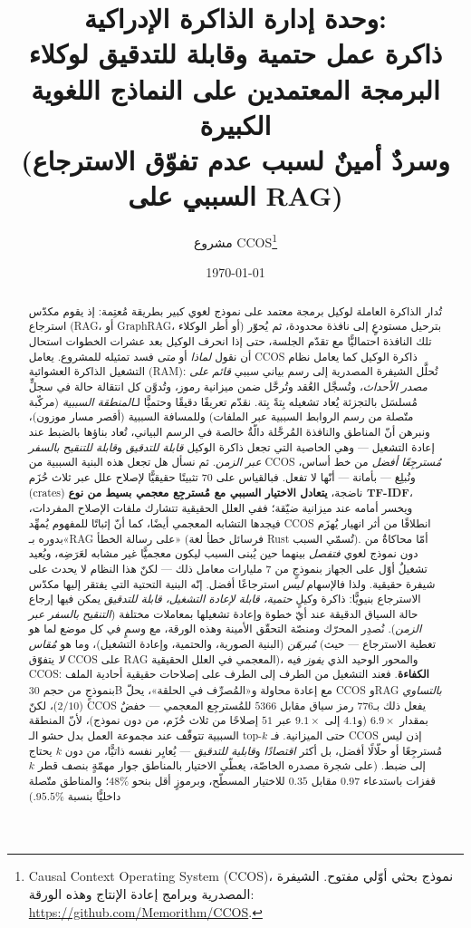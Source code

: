 \documentclass[11pt]{article}
\title{\textbf{وحدة إدارة الذاكرة الإدراكية:\\ ذاكرة عمل حتمية وقابلة للتدقيق لوكلاء البرمجة المعتمدين على النماذج اللغوية الكبيرة\\ \large (وسردٌ أمينٌ لسبب عدم تفوّق الاسترجاع السببي على RAG)}}
\author{مشروع CCOS\thanks{Causal Context Operating System (CCOS)، نموذج بحثي أوّلي
مفتوح. الشيفرة المصدرية وبرامج إعادة الإنتاج وهذه الورقة:
\url{https://github.com/Memorithm/CCOS}.}}
\date{\today}
\begin{document}
\maketitle

\begin{abstract}
تُدار الذاكرة العاملة لوكيل برمجة معتمد على نموذج لغوي كبير بطريقة مُعتِمة: إذ يقوم
مكدّس استرجاع (RAG، أو GraphRAG، أو أطر الوكلاء) بترحيل مستودعٍ إلى نافذة محدودة، ثم
يُحوّر تلك النافذة احتماليًّا مع تقدّم الجلسة، حتى إذا انحرف الوكيل بعد عشرات الخطوات
استحال أن نقول \emph{لماذا} أو \emph{متى} فسد تمثيله للمشروع. يعامل CCOS ذاكرة الوكيل
كما يعامل نظام التشغيل الذاكرة العشوائية (RAM): تُحلَّل الشيفرة المصدرية إلى رسم بياني
سببي \emph{قائم على مصدر الأحداث}، وتُسجَّل العُقد وتُرحَّل ضمن ميزانية رموز، وتُدوَّن كل
انتقالة حالة في سجلٍّ مُسلسَل بالتجزئة يُعاد تشغيله بِتةً بِتة. نقدّم تعريفًا دقيقًا
وحتميًّا لـ\emph{المنطقة السببية} (مركّبة متّصلة من رسم الروابط السببية عبر الملفات)
وللمسافة السببية (أقصر مسار موزون)، ونبرهن أنّ المناطق والنافذة المُرحَّلة دالّةٌ خالصة
في الرسم البياني، تُعاد بناؤها بالضبط عند إعادة التشغيل --- وهي الخاصية التي تجعل ذاكرة
الوكيل \emph{قابلة للتدقيق} و\emph{قابلة للتنقيح بالسفر عبر الزمن}. ثم نسأل هل تجعل هذه
البنية السببية من CCOS \emph{مُسترجِعًا أفضل} من خط أساس، ونُبلِغ --- بأمانة --- أنّها لا
تفعل. فبالقياس على $70$ تثبيتًا حقيقيًّا لإصلاح علل عبر ثلاث حُزَم (crates) ناضجة،
\textbf{يتعادل الاختيار السببي مع مُسترجِع معجمي بسيط من نوع TF-IDF}، ويخسر أمامه عند
ميزانية ضيّقة؛ ففي العلل الحقيقية تتشارك ملفات الإصلاح المفردات، فيجدها التشابه المعجمي
أيضًا، كما أنّ إثباتًا للمفهوم يُمهِّد CCOS انطلاقًا من أثر انهيار يُهزَم بدوره بـ«RAG على
رسالة الخطأ» (فرسائل خطأ لغة Rust تُسمّي السبب). أمّا محاكاةٌ من دون نموذج لغوي
\emph{فتفصل} بينهما حين يُبنى السبب ليكون معجميًّا غير مشابه لعَرَضِه، ويُعيد تشغيلٌ أوّل
على الجهاز بنموذجٍ من $7$ مليارات معامل ذلك --- لكنّ هذا النظام لا يحدث على شيفرة حقيقية.
ولذا فالإسهام \emph{ليس} استرجاعًا أفضل. إنّه البنية التحتية التي يفتقر إليها مكدّس
الاسترجاع بنيويًّا: ذاكرة وكيلٍ \emph{حتمية، قابلة لإعادة التشغيل، قابلة للتدقيق} يمكن فيها
إرجاع حالة السياق الدقيقة عند أيّ خطوة وإعادة تشغيلها بمعاملات مختلفة (\emph{التنقيح بالسفر
عبر الزمن}). نُصدِر المحرّك ومنصّة التحقّق الأمينة وهذه الورقة، مع وسمٍ في كل موضع لما هو
\emph{مُبرهَن} (البنية الصورية، والحتمية، وإعادة التشغيل)، وما هو \emph{مُقاس} (تغطية
الاسترجاع --- حيث \emph{لا} يتفوّق CCOS على RAG المعجمي في العلل الحقيقية)، والمحور الوحيد
الذي \emph{يفوز} فيه CCOS: \textbf{الكفاءة}. فعند التشغيل من الطرف إلى الطرف على إصلاحات
حقيقية أحادية الملف بنموذجٍ من حجم 30B مع إعادة محاولة و«المُصرِّف في الحلقة»، يحلّ CCOS
وRAG \emph{بالتساوي} ($2/10$)، لكنّ CCOS يفعل ذلك بـ$776$ رمز سياق مقابل $5366$
للمُسترجِع المعجمي --- خفضٌ بمقدار $6.9\times$ (و$4.1$ إلى $9.1\times$ عبر $51$ إصلاحًا من
ثلاث حُزَم، من دون نموذج)، لأنّ المنطقة السببية تتوقّف عند مجموعة العمل بدل حشو
الـ top-$k$ حتى الميزانية. فـ CCOS إذن ليس مُسترجِعًا أو حلّالًا أفضل، بل أكثر
\emph{اقتصادًا} و\emph{قابلية للتدقيق} --- يُعايِر نفسه ذاتيًّا، من دون $k$ يحتاج إلى ضبط.
(على شجرة مصدره الخاصّة، يغطّي الاختيار بالمناطق جوار مهمّةٍ بنصف قطر $k$ قفزات باستدعاء
$0.97$ مقابل $0.35$ للاختيار المسطّح، وبرموزٍ أقل بنحو $48\%$؛ والمناطق متّصلة داخليًّا
بنسبة $95.5\%$.)
\end{abstract}
\end{document}
